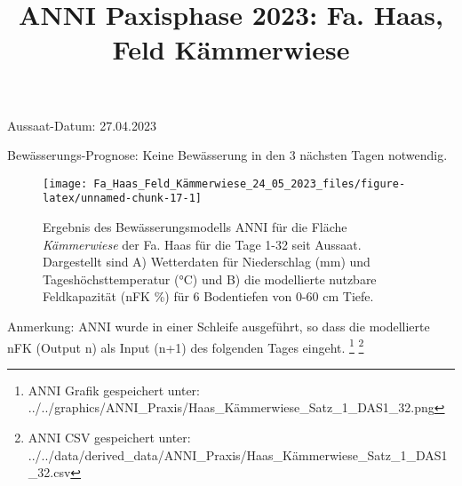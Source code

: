 \documentclass[
]{article}
\title{ANNI Paxisphase 2023: Fa. Haas, Feld Kämmerwiese}
\author{}
\date{\vspace{-2.5em}}
\begin{document}
\maketitle

Aussaat-Datum: 27.04.2023

Bewässerungs-Prognose: Keine Bewässerung in den 3 nächsten Tagen
notwendig.

\hfill\break

\begin{figure}[H]
\texttt{[image: Fa\_Haas\_Feld\_Kämmerwiese\_24\_05\_2023\_files/figure-latex/unnamed-chunk-17-1]} \caption{Ergebnis des Bewässerungsmodells ANNI für die Fläche \textit{Kämmerwiese} der Fa. Haas für die Tage 1-32 seit Aussaat. Dargestellt sind A) Wetterdaten für Niederschlag (mm) und Tageshöchsttemperatur (°C) und B) die modellierte nutzbare Feldkapazität (nFK \%) für 6 Bodentiefen von 0-60 cm Tiefe.}\label{fig:unnamed-chunk-17}
\end{figure}

Anmerkung: ANNI wurde in einer Schleife ausgeführt, so dass die
modellierte nFK (Output n) als Input (n+1) des folgenden Tages eingeht.
\footnote{ANNI Grafik gespeichert unter:
  ../../graphics/ANNI\_Praxis/Haas\_Kämmerwiese\_Satz\_1\_DAS1\_32.png}
\footnote{ANNI CSV gespeichert unter:
  ../../data/derived\_data/ANNI\_Praxis/Haas\_Kämmerwiese\_Satz\_1\_DAS1\_32.csv}
\end{document}
